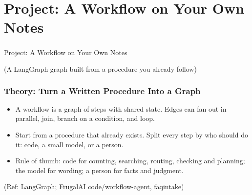 
\section[Notes Flow]{Project: A Workflow on Your Own Notes}

\begin{frame}[fragile]\frametitle{}
\begin{center}
{\Large Project: A Workflow on Your Own Notes}

\medskip
{\small (A LangGraph graph built from a procedure you already follow)}
\end{center}
\end{frame}

\begin{frame}[fragile]\frametitle{Theory: Turn a Written Procedure Into a Graph}
\begin{itemize}
\item A workflow is a graph of steps with shared state. Edges can fan out in parallel, join, branch on a condition, and loop.
\item Start from a procedure that already exists. Split every step by who should do it: code, a small model, or a person.
\item Rule of thumb: code for counting, searching, routing, checking and planning; the model for wording; a person for facts and judgment.
\end{itemize}
\begin{center}
\scriptsize
{}
\end{center}
{\tiny (Ref: LangGraph; FrugalAI code/workflow-agent, faqintake)}
\end{frame}


